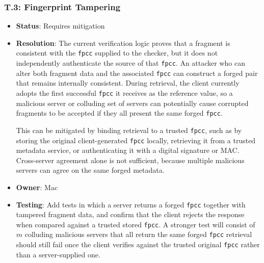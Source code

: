 \documentclass[../veristore_security_model.tex]{subfiles}
\begin{document}
\subsubsection{T.3: Fingerprint Tampering}
\begin{itemize}
    \item \textbf{Status}: Requires mitigation
    \item \textbf{Resolution}: The current verification logic proves that a fragment is consistent with the \texttt{fpcc} supplied to the checker, but it does not independently authenticate the source of that \texttt{fpcc}. An attacker who can alter both fragment data and the associated \texttt{fpcc} can construct a forged pair that remains internally consistent. During retrieval, the client currently adopts the first successful \texttt{fpcc} it receives as the reference value, so a malicious server or colluding set of servers can potentially cause corrupted fragments to be accepted if they all present the same forged \texttt{fpcc}. 
    
    This can be mitigated by binding retrieval to a trusted \texttt{fpcc}, such as by storing the original client-generated \texttt{fpcc} locally, retrieving it from a trusted metadata service, or authenticating it with a digital signature or MAC. Cross-server agreement alone is not sufficient, because multiple malicious servers can agree on the same forged metadata.
    \item \textbf{Owner}: Mac
    \item \textbf{Testing}: Add tests in which a server returns a forged \texttt{fpcc} together with tampered fragment data, and confirm that the client rejects the response when compared against a trusted stored \texttt{fpcc}. A stronger test will consist of $m$ colluding malicious servers that all return the same forged \texttt{fpcc} \textendash{} retrieval should still fail once the client verifies against the trusted original \texttt{fpcc} rather than a server-supplied one.
\end{itemize}
\end{document}
